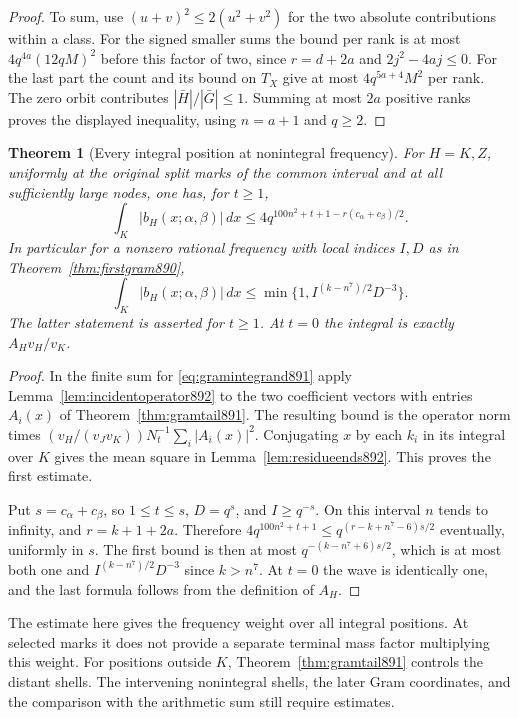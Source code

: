 \documentclass[a4paper,11pt]{article}
\newtheorem{theorem}[proposition]{Theorem}
\theoremstyle{definition}
\theoremstyle{remark}
\numberwithin{equation}{section}
\begin{document}
\begin{proof}
To sum, use \((u+v)^2\le2(u^2+v^2)\) for the two absolute
contributions within a class. For the signed smaller sums the
bound per rank is at most \(4q^{4a}(12qM)^2\) before this factor
of two, since \(r=d+2a\) and \(2j^2-4aj\le0\).
For the last part the count and its bound on \(T_X\) give at
most \(4q^{5a+4}M^2\) per rank. The zero orbit contributes
\(|\bar H|/|\bar G|\le1\). Summing at most \(2a\) positive ranks
proves the displayed inequality, using \(n=a+1\) and \(q\ge2\).
\end{proof}

\begin{theorem}[Every integral position at nonintegral frequency]
\leavevmode\label{thm:integralfreq892}
For \(H=K,Z\), uniformly at the original split marks of the common
interval and at all sufficiently large nodes, one has, for \(t\ge1\),
\[
 \int_K |b_H(x;\alpha,\beta)|\,dx
        \le 4q^{100n^2+t+1-r(c_\alpha+c_\beta)/2}.
\]
In particular for a nonzero rational frequency with local
indices \(I,D\) as in Theorem~\ref{thm:firstgram890},
\[
 \int_K |b_H(x;\alpha,\beta)|\,dx
                     \le\min\{1,I^{(k-n^7)/2}D^{-3}\}.
\]
The latter statement is asserted for \(t\ge1\). At \(t=0\) the
integral is exactly \(A_H v_H/v_K\).
\end{theorem}
\begin{proof}
In the finite sum for \eqref{eq:gramintegrand891} apply
Lemma~\ref{lem:incidentoperator892} to the two coefficient vectors
with entries \(A_i(x)\) of Theorem~\ref{thm:gramtail891}.
The resulting bound is the operator norm times
\((v_H/(v_Jv_K))N_t^{-1}\sum_i |A_i(x)|^2\).
Conjugating \(x\) by each \(k_i\) in its integral over \(K\)
gives the mean square in Lemma~\ref{lem:residueends892}.
This proves the first estimate.

Put \(s=c_\alpha+c_\beta\), so \(1\le t\le s\), \(D=q^s\),
and \(I\ge q^{-s}\). On this interval \(n\) tends to infinity,
and \(r=k+1+2a\). Therefore
\(4q^{100n^2+t+1}\le q^{(r-k+n^7-6)s/2}\) eventually,
uniformly in \(s\). The first bound is then at most
\(q^{-(k-n^7+6)s/2}\), which is at most both one and
\(I^{(k-n^7)/2}D^{-3}\) since \(k>n^7\). At \(t=0\) the
wave is identically one, and the last formula follows from
the definition of \(A_H\).
\end{proof}

The estimate here gives the frequency weight over all integral
positions. At selected marks it does not provide a separate
terminal mass factor multiplying this weight. For positions
outside \(K\), Theorem~\ref{thm:gramtail891} controls the
distant shells. The intervening nonintegral shells, the later
Gram coordinates, and the comparison with the arithmetic sum
still require estimates.
\clearpage
\end{document}

